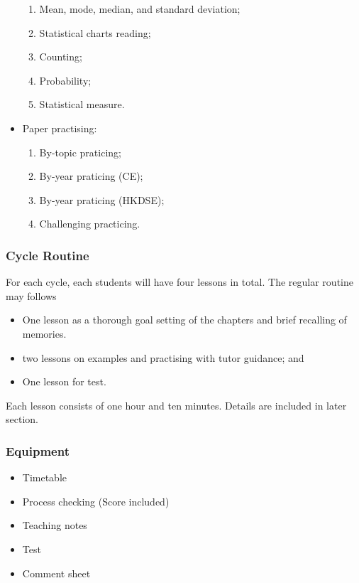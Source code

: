 \documentclass{article}
\begin{document}
\begin{itemize}
\begin{enumerate}
            \item Mean, mode, median, and standard deviation;
            \item Statistical charts reading;
            \item Counting;
            \item Probability;
            \item Statistical measure.
        \end{enumerate}
        \item Paper practising:\begin{enumerate}
            \item By-topic praticing;
            \item By-year praticing (CE);
            \item By-year praticing (HKDSE);
            \item Challenging practicing.
        \end{enumerate}
    \end{itemize}

    \subsubsection*{Cycle Routine}
    For each cycle, each students will have four lessons in total. The regular routine may follows
    \begin{itemize}
        \item One lesson as a thorough goal setting of the chapters and brief recalling of memories.
        \item two lessons on examples and practising with tutor guidance; and
        \item One lesson for test.
    \end{itemize}

    Each lesson consists of one hour and ten minutes. Details are included in later section.

    \subsubsection*{Equipment}
    \begin{itemize}
        \item Timetable
        \item Process checking (Score included)
        \item Teaching notes
        \item Test
        \item Comment sheet
    \end{itemize}
\end{document}
